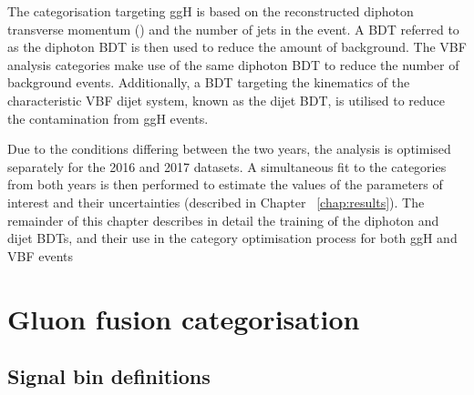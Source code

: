 The categorisation targeting ggH is based on the reconstructed diphoton transverse momentum (\ptgg) 
and the number of jets in the event. 
A BDT referred to as the diphoton BDT is then used to reduce the amount of background. 
The VBF analysis categories make use of the same diphoton BDT 
to reduce the number of background events. 
Additionally, a BDT targeting the kinematics of the characteristic VBF dijet system, 
known as the dijet BDT, is utilised to reduce the contamination from ggH events.

Due to the conditions differing between the two years, 
the analysis is optimised separately for the 2016 and 2017 datasets. 
A simultaneous fit to the categories from both years is then performed to estimate the 
values of the parameters of interest and their uncertainties (described in Chapter ~\ref{chap:results}).
The remainder of this chapter describes in detail the training of the diphoton and dijet BDTs, 
and their use in the category optimisation process for both ggH and VBF events

\section{Gluon fusion categorisation}
\subsection{Signal bin definitions}

